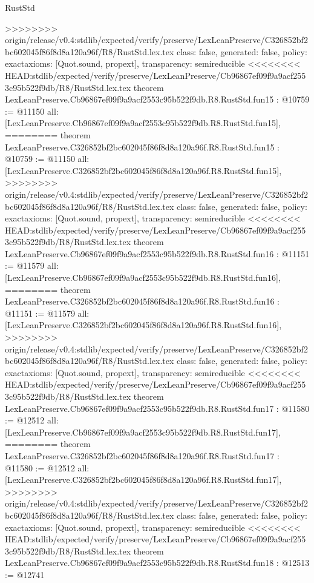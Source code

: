 \begin{lexlean}{RustStd}
\begin{coremodule}
{\begin{coremodule}
{{{{{{{{{{{{{{{{{{>>>>>>>> origin/release/v0.4:stdlib/expected/verify/preserve/LexLeanPreserve/C326852bf2bc602045f86f8d8a120a96f/R8/RustStd.lex.tex
  class: false,
  generated: false,
  policy: exact{axioms: [Quot.sound, propext]},
  transparency: semireducible
}
<<<<<<<< HEAD:stdlib/expected/verify/preserve/LexLeanPreserve/Cb96867ef09f9a9acf2553c95b522f9db/R8/RustStd.lex.tex
theorem LexLeanPreserve.Cb96867ef09f9a9acf2553c95b522f9db.R8.RustStd.fun15 : @10759 := @11150 {
  all: [LexLeanPreserve.Cb96867ef09f9a9acf2553c95b522f9db.R8.RustStd.fun15],
========
theorem LexLeanPreserve.C326852bf2bc602045f86f8d8a120a96f.R8.RustStd.fun15 : @10759 := @11150 {
  all: [LexLeanPreserve.C326852bf2bc602045f86f8d8a120a96f.R8.RustStd.fun15],
>>>>>>>> origin/release/v0.4:stdlib/expected/verify/preserve/LexLeanPreserve/C326852bf2bc602045f86f8d8a120a96f/R8/RustStd.lex.tex
  class: false,
  generated: false,
  policy: exact{axioms: [Quot.sound, propext]},
  transparency: semireducible
}
<<<<<<<< HEAD:stdlib/expected/verify/preserve/LexLeanPreserve/Cb96867ef09f9a9acf2553c95b522f9db/R8/RustStd.lex.tex
theorem LexLeanPreserve.Cb96867ef09f9a9acf2553c95b522f9db.R8.RustStd.fun16 : @11151 := @11579 {
  all: [LexLeanPreserve.Cb96867ef09f9a9acf2553c95b522f9db.R8.RustStd.fun16],
========
theorem LexLeanPreserve.C326852bf2bc602045f86f8d8a120a96f.R8.RustStd.fun16 : @11151 := @11579 {
  all: [LexLeanPreserve.C326852bf2bc602045f86f8d8a120a96f.R8.RustStd.fun16],
>>>>>>>> origin/release/v0.4:stdlib/expected/verify/preserve/LexLeanPreserve/C326852bf2bc602045f86f8d8a120a96f/R8/RustStd.lex.tex
  class: false,
  generated: false,
  policy: exact{axioms: [Quot.sound, propext]},
  transparency: semireducible
}
<<<<<<<< HEAD:stdlib/expected/verify/preserve/LexLeanPreserve/Cb96867ef09f9a9acf2553c95b522f9db/R8/RustStd.lex.tex
theorem LexLeanPreserve.Cb96867ef09f9a9acf2553c95b522f9db.R8.RustStd.fun17 : @11580 := @12512 {
  all: [LexLeanPreserve.Cb96867ef09f9a9acf2553c95b522f9db.R8.RustStd.fun17],
========
theorem LexLeanPreserve.C326852bf2bc602045f86f8d8a120a96f.R8.RustStd.fun17 : @11580 := @12512 {
  all: [LexLeanPreserve.C326852bf2bc602045f86f8d8a120a96f.R8.RustStd.fun17],
>>>>>>>> origin/release/v0.4:stdlib/expected/verify/preserve/LexLeanPreserve/C326852bf2bc602045f86f8d8a120a96f/R8/RustStd.lex.tex
  class: false,
  generated: false,
  policy: exact{axioms: [Quot.sound, propext]},
  transparency: semireducible
}
<<<<<<<< HEAD:stdlib/expected/verify/preserve/LexLeanPreserve/Cb96867ef09f9a9acf2553c95b522f9db/R8/RustStd.lex.tex
theorem LexLeanPreserve.Cb96867ef09f9a9acf2553c95b522f9db.R8.RustStd.fun18 : @12513 := @12741 {
}}}}}}}}}}}}}}}}}}}}}
\end{coremodule}}
\end{coremodule}
\end{lexlean}
